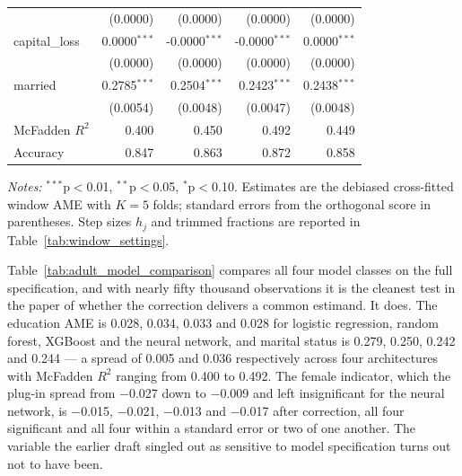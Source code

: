 \documentclass[12pt]{article}
\begin{document}
\begin{table}[htbp]
\begin{threeparttable}
\begin{tabular}{lrrrr}
				& (0.0000) & (0.0000) & (0.0000) & (0.0000) \\
				capital\_loss & 0.0000$^{***}$ & -0.0000$^{***}$ & -0.0000$^{***}$ & 0.0000$^{***}$ \\
				& (0.0000) & (0.0000) & (0.0000) & (0.0000) \\
				married & 0.2785$^{***}$ & 0.2504$^{***}$ & 0.2423$^{***}$ & 0.2438$^{***}$ \\
				& (0.0054) & (0.0048) & (0.0047) & (0.0048) \\
				\midrule
				McFadden $R^2$ & 0.400 & 0.450 & 0.492 & 0.449 \\
				Accuracy & 0.847 & 0.863 & 0.872 & 0.858 \\
				\bottomrule
				\end{tabular}
				\begin{tablenotes}
				\footnotesize
				\item \textit{Notes:} $^{***}$p$<$0.01, $^{**}$p$<$0.05, $^{*}$p$<$0.10. Estimates are the debiased cross-fitted window AME with $K=5$ folds; standard errors from the orthogonal score in parentheses. Step sizes $h_j$ and trimmed fractions are reported in Table~\ref{tab:window_settings}.
				\end{tablenotes}
		\end{threeparttable}
	\end{table}
	
	Table~\ref{tab:adult_model_comparison} compares all four model classes on the full specification, and with nearly fifty thousand observations it is the cleanest test in the paper of whether the correction delivers a common estimand. It does. The education AME is 0.028, 0.034, 0.033 and 0.028 for logistic regression, random forest, XGBoost and the neural network, and marital status is 0.279, 0.250, 0.242 and 0.244 --- a spread of 0.005 and 0.036 respectively across four architectures with McFadden $R^2$ ranging from 0.400 to 0.492. The female indicator, which the plug-in spread from $-$0.027 down to $-$0.009 and left insignificant for the neural network, is $-$0.015, $-$0.021, $-$0.013 and $-$0.017 after correction, all four significant and all four within a standard error or two of one another. The variable the earlier draft singled out as sensitive to model specification turns out not to have been.
\end{document}

